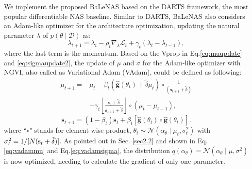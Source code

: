 \documentclass[10pt,twocolumn,letterpaper]{article}
\begin{document}
We implement the proposed BaLeNAS based on the DARTS \cite{liu2018darts} framework, the most popular differentiable NAS baseline. Similar to DARTS, BaLeNAS also considers an Adam-like optimizer for the architecture optimization, updating the natural parameter $\lambda$ of $p(\theta \mid \mathcal{D})$ as:
\begin{equation} \label{eq:vadamupdate}
\lambda_{t+1}= \lambda_t-\rho_t \nabla_{\lambda}\mathcal{L}_t+\gamma_t(\lambda_t-\lambda_{t-1}),
\end{equation}
where the last term is the momentum. Based on the Vprop in Eq.\eqref{eq:muupdate} and \eqref{eq:sigmaupdate2}, the update of $\mu$ and $\sigma$ for the Adam-like optimizer with NGVI, also called as Variational Adam (VAdam), could be defined as following:
\begin{equation} \label{eq:vadammu}
\begin{aligned}
\mu_{t+1}=&\mu_t-\beta_t(\hat{\textbf{g}}(\theta_t)+\tilde{\delta}\mu_t) \circ \frac{1}{(\textbf{s}_{t+1}+\tilde{\delta})}\\
&+\gamma_t\left \lfloor \frac{\mathbf{s}_t+\tilde{\delta}}{\mathbf{s}_{t+1}+\tilde{\delta}} \right \rfloor \circ (\mu_{t}-\mu_{t-1}),
\end{aligned}
\end{equation}
\begin{equation} \label{eq:vadamsigma}
\textbf{s}_{t+1}=(1-\beta_t)\textbf{s}_t+\beta_t[\hat{\textbf{g}}(\theta_t)\circ \hat{\textbf{g}}(\theta_t)].
\end{equation}
where ``$\circ$" stands for element-wise product, $\theta_t\sim \mathcal{N}({\alpha_\theta} \mid \mu_t,\sigma_t^2)$ with $\sigma_t^2=1/[N(\textup{s}_t+\tilde{\delta})]$. As pointed out in Sec. \ref{sec2.2} and shown in Eq.\eqref{eq:vadammu} and Eq.\eqref{eq:vadamsigma}, the distribution  $q(\alpha_\theta)=\mathcal{N}(\alpha_\theta \mid \mu, \sigma^2)$ is now optimized, needing to calculate the gradient of only one parameter. 
\end{document}

